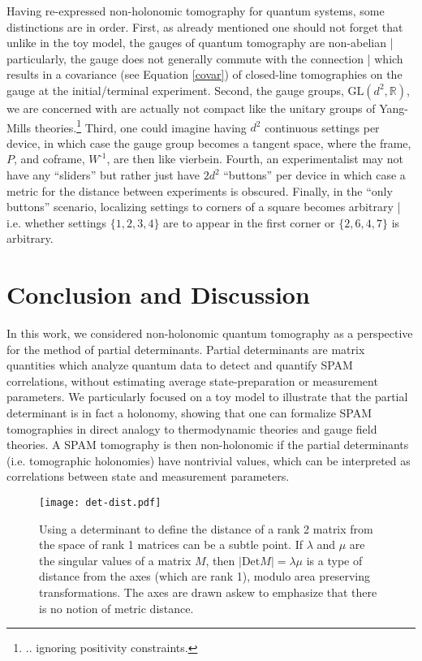\documentclass[pra, 10pt, notitlepage, twocolumn]{revtex4-1}
\newcommand{\Det}{\mathrm{Det}}
\newcommand{\inv}{\text{-1}}
\newcommand{\R}{\mathbb{R}}
\begin{document}
Having re-expressed non-holonomic tomography for quantum systems, some distinctions are in order.
First, as already mentioned one should not forget that unlike in the toy model, the gauges of quantum tomography are non-abelian
| particularly, the gauge does not generally commute with the connection
| which results in a covariance (see Equation \ref{covar}) of closed-line tomographies on the gauge at the initial/terminal experiment.
Second, the gauge groups, $\mathrm{GL}(d^2,\R)$, we are concerned with are actually not compact like the unitary groups of Yang-Mills theories.\footnote{
.. ignoring positivity constraints.}
Third, one could imagine having $d^2$ continuous settings per device,
in which case the gauge group becomes a tangent space, where the frame, $P$, and coframe, $W^\inv$, are then like vierbein.
Fourth, an experimentalist may not have any ``sliders'' but rather just have $2d^2$ ``buttons'' per device
in which case a metric for the distance between experiments is obscured.
Finally, in the ``only buttons'' scenario, localizing settings to corners of a square becomes arbitrary
| i.e. whether settings $\{1,2,3,4\}$ are to appear in the first corner or $\{2,6,4,7\}$ is arbitrary.





\section{Conclusion and Discussion}


In this work, we considered non-holonomic quantum tomography as a perspective for the method of partial determinants\cite{jackson2015detecting}.
Partial determinants are matrix quantities which analyze quantum data to detect and quantify SPAM correlations,
without estimating average state-preparation or measurement parameters.
We particularly focused on a toy model to illustrate that the partial determinant is in fact a holonomy,
showing that one can formalize SPAM tomographies in direct analogy to thermodynamic theories and gauge field theories.
A SPAM tomography is then non-holonomic if the partial determinants (i.e. tomographic holonomies) have nontrivial values,
which can be interpreted as correlations between state and measurement parameters.

\begin{figure}[h!]
\centering
\texttt{[image: det-dist.pdf]}
\caption{
Using a determinant to define the distance of a rank 2 matrix from the space of rank 1 matrices can be a subtle point.
If $\lambda$ and $\mu$ are the singular values of a matrix $M$, then $|\Det M| = \lambda\mu$ is a type of distance from the axes (which are rank 1), modulo area preserving transformations.
The axes are drawn askew to emphasize that there is no notion of metric distance.
}\label{product}
\end{figure}
\end{document}
